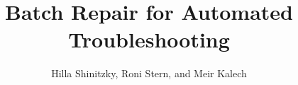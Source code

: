 \documentclass[review]{elsarticle}
\newcommand\meir[1]{\textcolor{red}{meir: #1}}
\begin{document}
\begin{frontmatter}

\title{Batch Repair for Automated Troubleshooting}

\author{Hilla Shinitzky, Roni Stern, and Meir Kalech}
\address{The Department of Software and Information Systems Engineering\\
Ben Gurion University of the Negev}






\begin{abstract}


\end{abstract}
\end{frontmatter}
\end{document}
